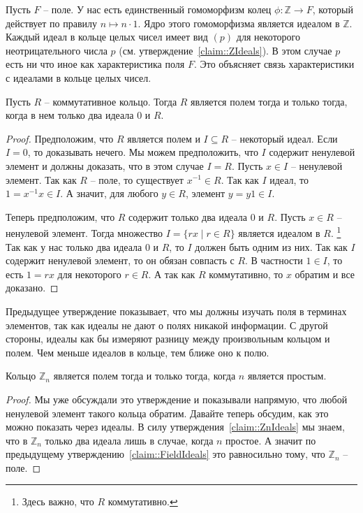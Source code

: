 \begin{remark}
Пусть $F$ -- поле.
У нас есть единственный гомоморфизм колец $\phi\colon \mathbb Z\to F$, который действует по правилу $n \mapsto n \cdot 1$.
Ядро этого гомоморфизма является идеалом в $\mathbb Z$.
Каждый идеал в кольце целых чисел имеет вид $(p)$ для некоторого неотрицательного числа $p$ (см. утверждение~\ref{claim::ZIdeals}).
В этом случае $p$ есть ни что иное как характеристика поля $F$.
Это объясняет связь характеристики с идеалами в кольце целых чисел.
\end{remark}

\begin{claim}
\label{claim::FieldIdeals}
Пусть $R$ -- коммутативное кольцо.
Тогда $R$ является полем тогда и только тогда, когда в нем только два идеала $0$ и $R$.
\end{claim}
\begin{proof}
Предположим, что $R$ является полем и $I\subseteq R$ -- некоторый идеал.
Если $I = 0$, то доказывать нечего.
Мы можем предположить, что $I$ содержит ненулевой элемент и должны доказать, что в этом случае $I = R$.
Пусть $x\in I$ -- ненулевой элемент.
Так как $R$ -- поле, то существует $x^{-1}\in R$.
Так как $I$ идеал, то $1 =x^{-1}x\in I$.
А значит, для любого $y\in R$, элемент $y = y 1 \in I$.

Теперь предположим, что $R$ содержит только два идеала $0$ и $R$.
Пусть $x\in R$ -- ненулевой элемент.
Тогда множество $I = \{rx \mid r\in R\}$ является идеалом в $R$.%
\footnote{Здесь важно, что $R$ коммутативно.}
Так как у нас только два идеала $0$ и $R$, то $I$ должен быть одним из них.
Так как $I$ содержит ненулевой элемент, то он обязан совпасть с $R$.
В частности $1\in I$, то есть $1 = rx$ для некоторого $r\in R$.
А так как $R$ коммутативно, то $x$ обратим и все доказано.
\end{proof}

Предыдущее утверждение показывает, что мы должны изучать поля в терминах элементов, так как идеалы не дают о полях никакой информации.
С другой стороны, идеалы как бы измеряют разницу между произвольным кольцом и полем.
Чем меньше идеалов в кольце, тем ближе оно к полю.

\begin{claim}
\label{claim::ZpField}
Кольцо $\mathbb Z_n$ является полем тогда и только тогда, когда $n$ является простым.
\end{claim}
\begin{proof}
Мы уже обсуждали это утверждение и показывали напрямую, что любой ненулевой элемент такого кольца обратим.
Давайте теперь обсудим, как это можно показать через идеалы.
В силу утверждения~\ref{claim::ZnIdeals} мы знаем, что в $\mathbb Z_n$ только два идеала лишь в случае, когда $n$ простое.
А значит по предыдущему утверждению~\ref{claim::FieldIdeals} это равносильно тому, что $\mathbb Z_n$ -- поле.
\end{proof}

